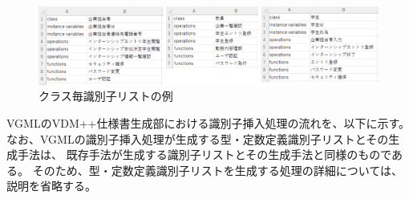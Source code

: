 \begin{figure}[t]
    \begin{center}
        \includegraphics[width=1.0\columnwidth]{image/vgml_sikibetushi_list.png}
        \caption{クラス毎識別子リストの例}
        \label{fig:vgml_sikibetushi_list}
    \end{center}
\end{figure}

VGMLのVDM++仕様書生成部における識別子挿入処理の流れを、以下に示す。
なお、VGMLの識別子挿入処理が生成する型・定数定義識別子リストとその生成手法は、
既存手法が生成する識別子リストとその生成手法と同様のものである。
そのため、型・定数定義識別子リストを生成する処理の詳細については、説明を省略する。

